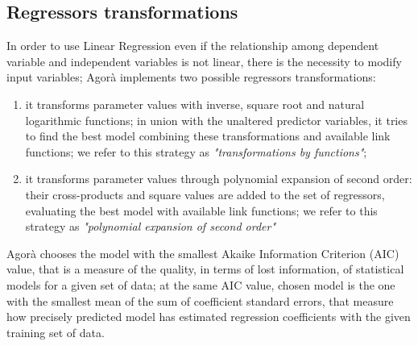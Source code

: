 \subsection{Regressors transformations}\label{regrTransforms}

In order to use Linear Regression even if the relationship among dependent variable and independent variables is not linear, there is the necessity to modify input variables; Agorà implements two possible regressors transformations:

\begin{enumerate}

    \item it transforms parameter values with inverse, square root and natural logarithmic functions; in union with the unaltered predictor variables, it tries to find the best model combining these transformations and available link functions; we refer to this strategy as \textit{"transformations by functions"};
    
    \item it transforms parameter values through polynomial expansion of second order: their cross-products and square values are added to the set of regressors, evaluating the best model with available link functions; we refer to this strategy as \textit{"polynomial expansion of second order"}

\end{enumerate}

Agorà chooses the model with the smallest Akaike Information Criterion (AIC) value, that is a measure of the quality, in terms of lost information, of statistical models for a given set of data; at the same AIC value, chosen model is the one with the smallest mean of the sum of coefficient standard errors, that measure how precisely predicted model has estimated regression coefficients with the given training set of data.
